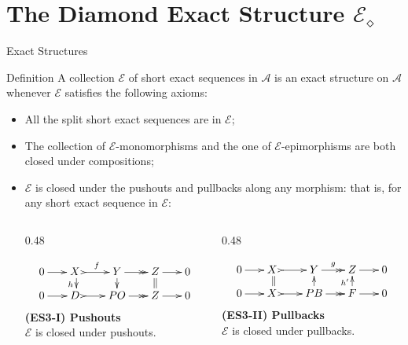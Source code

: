 \documentclass[t]{beamer}
\theoremstyle{plain}
\begin{document}
\section{The Diamond Exact Structure \texorpdfstring{$\mathcal{E}_\diamond$}{E-diamond}}
\begin{frame}{Exact Structures}
\begin{block}{Definition}
  A collection $\mathcal{E}$ of short exact sequences in $\mathscr{A}$ 
  is an exact structure on $\mathscr{A}$ whenever $\mathcal{E}$ satisfies 
  the following axioms:
  \end{block}
  
\pause

  \begin{itemize}
    \item[(ES1)] All the split short exact sequences are in $\mathcal{E}$;
\pause    
    \item[(ES2)] The collection of $\mathcal{E}$-monomorphisms and the one of $\mathcal{E}$-epimorphisms are
                both closed under compositions;
\pause
    \item[(ES3)] $\mathcal{E}$ is closed under the pushouts and pullbacks along any morphism: that is, for any short exact sequence in $\mathcal{E}$: 
  \vspace{-3em}
\pause
\begin{columns}[t]
  \begin{column}{0.48\textwidth}
    \begin{center}
      \[
      \xymatrix@C=6mm@R=3mm{
      0 \ar[r] & X\; \ar@{>->}[r]^{f} \ar[d]_{h} 
               & Y \ar@{->>}[r] \ar[d] 
               & Z \ar[r] \ar@{=}[d] & 0 \\
      0 \ar[r] & D \;\ar@{>->}[r] 
               & PO \ar@{->>}[r] 
               & Z \ar[r] & 0
      }
      \]
      \textbf{(ES3-I) Pushouts} \\
      $\mathcal{E}$ is closed under pushouts.
    \end{center}
  \end{column}
\pause
  \begin{column}{0.48\textwidth}
    \begin{center}
      \[
      \xymatrix@C=6mm@R=3mm{
      0 \ar[r] & X \; \ar@{>->}[r] \ar@{=}[d] 
               & Y \ar@{->>}[r]^{g}  
               & Z \ar[r] & 0 \\
      0 \ar[r] & X \; \ar@{>->}[r] 
               & PB \ar[u] \ar@{->>}[r] 
               & F \ar[r] \ar[u]^{h'} & 0
      }
      \]
      \textbf{(ES3-II) Pullbacks} \\
      $\mathcal{E}$ is closed under pullbacks.
    \end{center}
  \end{column}
\end{columns}

  \end{itemize}
\end{frame}
\end{document}

